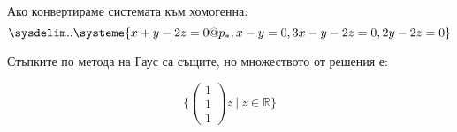 \documentclass{subfiles}
\begin{document}
\noindent Ако конвертираме системата към хомогенна:
\begin{equation*}
    \sysdelim..\systeme{
        x + y - 2z = 0@p_{*},
        x - y = 0,
        3x - y - 2z = 0,
        2y - 2z = 0
    }
\end{equation*}

\noindent Стъпките по метода на Гаус са същите, но множеството от решения е:

\begin{equation*}
    \{
        \left(\begin{array}{ c } 1 \\ 1 \\ 1 \end{array}\right) z
        \ |\ z \in \mathbb{R}
    \}
\end{equation*}
\end{document}
